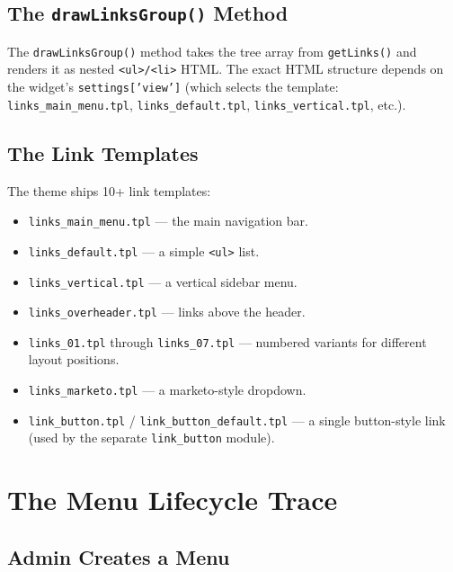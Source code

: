 \documentclass[11pt,a4paper]{article}
\begin{document}
\subsection{The \texttt{drawLinksGroup()} Method}

The \texttt{drawLinksGroup()} method takes the tree array from
\texttt{getLinks()} and renders it as nested \texttt{<ul>/<li>} HTML.
The exact HTML structure depends on the widget's
\texttt{settings['view']} (which selects the template:
\texttt{links\_main\_menu.tpl}, \texttt{links\_default.tpl},
\texttt{links\_vertical.tpl}, etc.).

\subsection{The Link Templates}

The theme ships 10+ link templates:

\begin{itemize}[leftmargin=1.6em,itemsep=2pt]
  \item \texttt{links\_main\_menu.tpl} --- the main navigation bar.
  \item \texttt{links\_default.tpl} --- a simple \texttt{<ul>} list.
  \item \texttt{links\_vertical.tpl} --- a vertical sidebar menu.
  \item \texttt{links\_overheader.tpl} --- links above the header.
  \item \texttt{links\_01.tpl} through \texttt{links\_07.tpl} ---
        numbered variants for different layout positions.
  \item \texttt{links\_marketo.tpl} --- a marketo-style dropdown.
  \item \texttt{link\_button.tpl} / \texttt{link\_button\_default.tpl}
        --- a single button-style link (used by the separate
        \texttt{link\_button} module).
\end{itemize}

\section{The Menu Lifecycle Trace}\label{sec:trace}

\subsection{Admin Creates a Menu}
\end{document}
